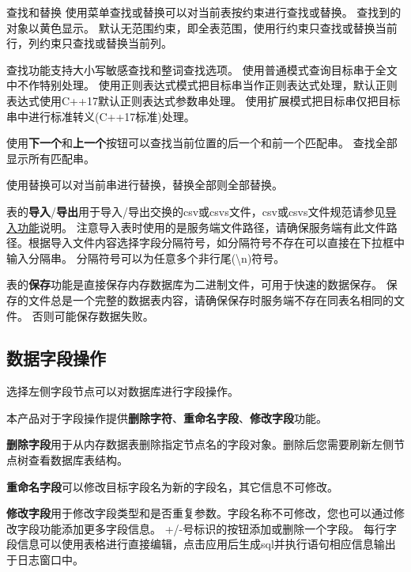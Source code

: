 查找和替换
使用菜单查找或替换可以对当前表按约束进行查找或替换。
查找到的对象以黄色显示。
默认无范围约束，即全表范围，使用行约束只查找或替换当前行，列约束只查找或替换当前列。

查找功能支持大小写敏感查找和整词查找选项。
使用普通模式查询目标串于全文中不作特别处理。
使用正则表达式模式把目标串当作正则表达式处理，默认正则表达式使用C++17默认正则表达式参数串处理。
使用扩展模式把目标串仅把目标串中进行标准转义(C++17标准)处理。

使用\textbf{下一个}和\textbf{上一个}按钮可以查找当前位置的后一个和前一个匹配串。
查找全部显示所有匹配串。

使用替换可以对当前串进行替换，替换全部则全部替换。

表的\textbf{导入}/\textbf{导出}用于导入/导出交换的csv或csvs文件，csv或csvs文件规范请参见\href{http://www.shucantech.com/zh/sql/sql_ref_0.2.0.html#import}{导入功能}说明。
注意导入表时使用的是服务端文件路径，请确保服务端有此文件路径。根据导入文件内容选择字段分隔符号，如分隔符号不存在可以直接在下拉框中输入分隔串。
分隔符号可以为任意多个非行尾(\textbackslash n)符号。

表的\textbf{保存}功能是直接保存内存数据库为二进制文件，可用于快速的数据保存。
保存的文件总是一个完整的数据表内容，请确保保存时服务端不存在同表名相同的文件。
否则可能保存数据失败。


\subsection{数据字段操作}
\bigskip

选择左侧字段节点可以对数据库进行字段操作。

本产品对于字段操作提供\textbf{删除字符}、\textbf{重命名字段}、\textbf{修改字段}功能。

\textbf{删除字段}用于从内存数据表删除指定节点名的字段对象。删除后您需要刷新左侧节点树查看数据库表结构。

\textbf{重命名字段}可以修改目标字段名为新的字段名，其它信息不可修改。

\textbf{修改字段}用于修改字段类型和是否重复参数。字段名称不可修改，您也可以通过修改字段功能添加更多字段信息。 +/-号标识的按钮添加或删除一个字段。
每行字段信息可以使用表格进行直接编辑，点击应用后生成sql并执行语句相应信息输出于日志窗口中。
